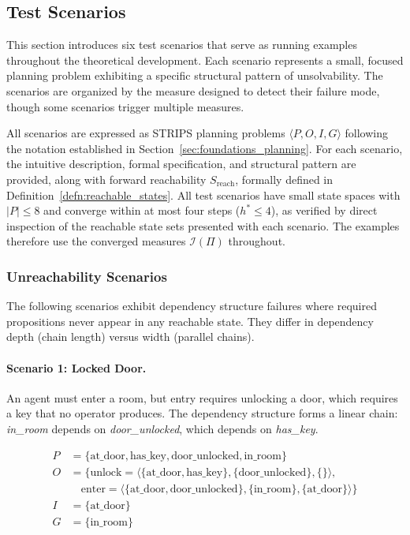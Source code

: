 \subsection{Test Scenarios}
\label{sec:test_scenarios}

This section introduces six test scenarios that serve as running examples throughout the theoretical development. Each scenario represents a small, focused planning problem exhibiting a specific structural pattern of unsolvability. The scenarios are organized by the measure designed to detect their failure mode, though some scenarios trigger multiple measures.

All scenarios are expressed as \ac{STRIPS} planning problems $\langle P, O, I, G \rangle$ following the notation established in Section~\ref{sec:foundations_planning}. For each scenario, the intuitive description, formal specification, and structural pattern are provided, along with forward reachability $S_{\text{reach}}$, formally defined in Definition~\ref{defn:reachable_states}. All test scenarios have small state spaces with $|P| \leq 8$ and converge within at most four steps ($h^* \leq 4$), as verified by direct inspection of the reachable state sets presented with each scenario. The examples therefore use the converged measures $\mathcal{I}(\Pi)$ throughout.

\subsubsection{Unreachability Scenarios}

The following scenarios exhibit dependency structure failures where required propositions never appear in any reachable state. They differ in dependency depth (chain length) versus width (parallel chains).

\paragraph{Scenario 1: Locked Door.}

An agent must enter a room, but entry requires unlocking a door, which requires a key that no operator produces. The dependency structure forms a linear chain: \textit{in\_room} depends on \textit{door\_unlocked}, which depends on \textit{has\_key}.

\begin{align*}
  P & = \{\text{at\_door}, \text{has\_key}, \text{door\_unlocked}, \text{in\_room}\}                                               \\
  O & = \{ \text{unlock} = \langle \{\text{at\_door}, \text{has\_key}\}, \{\text{door\_unlocked}\}, \{\} \rangle,                  \\
    & \quad \text{enter} = \langle \{\text{at\_door}, \text{door\_unlocked}\}, \{\text{in\_room}\}, \{\text{at\_door}\} \rangle \} \\
  I & = \{\text{at\_door}\}                                                                                                        \\
  G & = \{\text{in\_room}\}
\end{align*}

